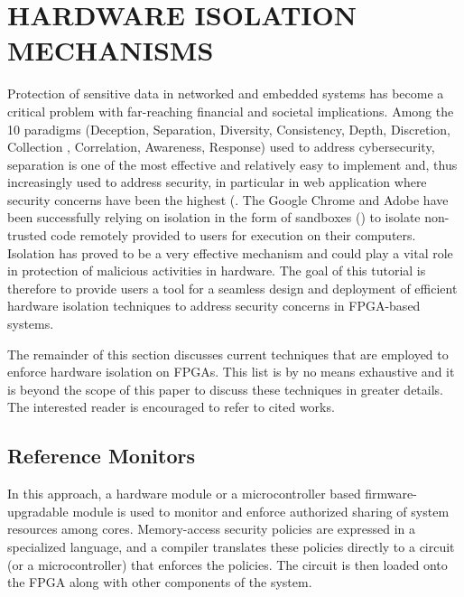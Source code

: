 \documentclass[sigconf]{acmart}
\theoremstyle{plain}
\theoremstyle{remark}
\begin{document}
\section{HARDWARE ISOLATION MECHANISMS} \label{sec:problem_definition}

 
Protection of sensitive data in networked and embedded systems has become a critical problem with far-reaching financial and societal implications. Among the 10 paradigms (Deception, Separation, Diversity,  Consistency, Depth, Discretion, Collection , Correlation, Awareness, Response)  used to address cybersecurity, separation is one of the most effective and relatively easy to implement and, thus increasingly used to address security, in particular in web application where security concerns have been the highest (\cite{Mello2015,  JonesCU, Fireglass2016, Cottrell2017}. The Google Chrome and Adobe have been successfully relying on isolation in the form of sandboxes (\cite{chromiumSB, adobeSB}) to isolate non-trusted code remotely provided to users for execution on their computers. Isolation has proved to be a very effective mechanism and could play a vital role in protection of malicious activities in hardware. The goal of this tutorial is therefore to provide users a tool for a seamless design and deployment of efficient hardware isolation techniques to address security concerns in FPGA-based systems.

The remainder of this section discusses current techniques that are employed to enforce hardware isolation on FPGAs. This list is by no means exhaustive and it is beyond the scope of this paper to discuss these techniques in greater details. The interested reader is encouraged to refer to cited works.

\subsection{Reference Monitors}

In this approach, a hardware module or a microcontroller based firmware-upgradable module is used to monitor and enforce authorized sharing of system
resources among cores. Memory-access security policies are expressed in a specialized language, and a compiler translates these policies directly to a circuit (or a microcontroller) that enforces the policies. The circuit is then loaded onto the FPGA along with other components of the system.
\end{document}
